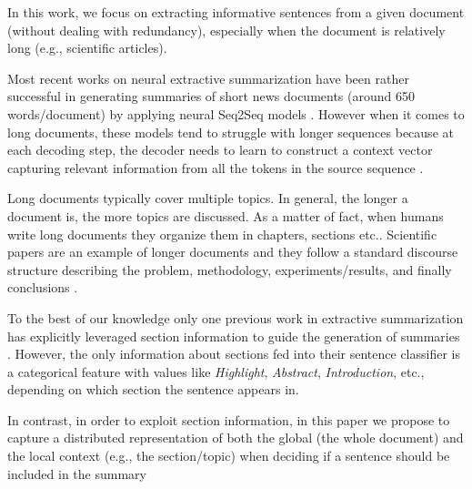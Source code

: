 In this work, we focus on extracting informative sentences from a given document (without dealing with redundancy), especially when the document is relatively long (e.g., scientific articles).

Most recent works on neural extractive summarization have been rather successful in generating summaries of short news documents (around 650 words/document) \cite{RNN_beyond} by applying neural Seq2Seq models \cite{cheng&lapata}. However when it comes to long documents, these models tend to struggle with longer sequences because at each decoding step, the decoder needs to learn to construct a context vector capturing relevant information from all the tokens in the source sequence \cite{shao}. 

Long documents typically cover multiple topics. In general, the longer  a document is, the more topics are discussed. As a matter of fact, when humans write long documents they organize them in chapters, sections etc.. Scientific papers are an example of longer documents and they follow a standard discourse structure describing the problem, methodology, experiments/results, and finally conclusions \cite{scientific_paper}.

To the best of our knowledge only one previous work in extractive summarization has explicitly leveraged section information to guide the generation of summaries \cite{section_supervised}. However, the only information about sections fed into
their sentence classifier is a categorical feature with values like \textit{Highlight}, \textit{Abstract},
\textit{Introduction}, etc.,
depending on which section the sentence appears in.

In contrast, in order to exploit section information, in this paper we propose to capture a distributed representation of both the global (the whole document) and the local context (e.g., the section/topic) when deciding if a sentence should be included in the summary

